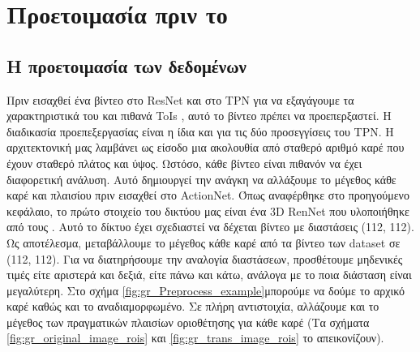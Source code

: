 \section{Προετοιμασία πριν το }

\subsection{Η προετοιμασία των δεδομένων}
Πριν εισαχθεί ένα βίντεο στο  \en ResNet \gr  και στο \en  TPN \gr  για να εξαγάγουμε τα χαρακτηριστικά του και πιθανά \en  ToIs \gr , αυτό το βίντεο πρέπει να προεπερξαστεί.
Η διαδικασία προεπεξεργασίας είναι η ίδια και για τις δύο προσεγγίσεις του \en TPN\gr.
Η αρχιτεκτονική μας λαμβάνει ως είσοδο μια ακολουθία από σταθερό αριθμό καρέ  που έχουν σταθερό πλάτος και ύψος. Ωστόσο, κάθε βίντεο είναι πιθανόν να έχει διαφορετική ανάλυση. Αυτό δημιουργεί
την ανάγκη να αλλάξουμε  το μέγεθος κάθε καρέ και πλαισίου πριν εισαχθεί στο \en ActionNet\gr. Όπως αναφέρθηκε στο προηγούμενο κεφάλαιο, το πρώτο στοιχείο του δικτύου μας είναι ένα \en  3D RenNet  \gr
που υλοποιήθηκε από τους \en  \cite{hara3dcnns}\gr. Αυτό το δίκτυο έχει σχεδιαστεί να δέχεται βίντεο  με διαστάσεις (112, 112).
Ως αποτέλεσμα, μεταβάλλουμε  το μέγεθος κάθε καρέ από τα βίντεο των \en dataset \gr σε (112, 112). Για να διατηρήσουμε την αναλογία διαστάσεων, προσθέτουμε μηδενικές τιμές είτε
αριστερά και δεξιά, είτε πάνω και κάτω, ανάλογα με το ποια διάσταση είναι μεγαλύτερη. Στο σχήμα  \en\ref{fig:gr_Preprocess_example}\gr μπορούμε να δούμε το αρχικό καρέ καθώς και το αναδιαμορφωμένο.
Σε πλήρη αντιστοιχία, αλλάζουμε και το μέγεθος των πραγματικών πλαισίων οριοθέτησης για κάθε καρέ (Τα σχήματα
\en\ref{fig:gr_original_image_rois} \gr   και \en\ref{fig:gr_trans_image_rois} \gr  το απεικονίζουν).


